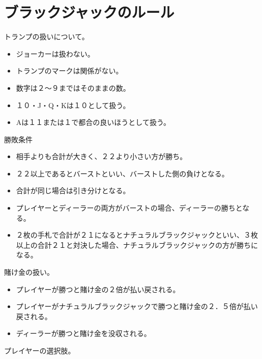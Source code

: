 \section{ブラックジャックのルール}
トランプの扱いについて。
\begin{itemize}
\item ジョーカーは扱わない。
\item トランプのマークは関係がない。
\item 数字は２～９まではそのままの数。
\item １０・J・Q・Kは１０として扱う。
\item Aは１１または１で都合の良いほうとして扱う。
\end{itemize}
勝敗条件
\begin{itemize}
\item 相手よりも合計が大きく、２２より小さい方が勝ち。
\item ２２以上であるとバーストといい、バーストした側の負けとなる。
\item 合計が同じ場合は引き分けとなる。
\item プレイヤーとディーラーの両方がバーストの場合、ディーラーの勝ちとなる。
\item ２枚の手札で合計が２１になるとナチュラルブラックジャックといい、３枚以上の合計２１と対決した場合、ナチュラルブラックジャックの方が勝ちになる。
\end{itemize}
賭け金の扱い。
\begin{itemize}
\item プレイヤーが勝つと賭け金の２倍が払い戻される。
\item プレイヤーがナチュラルブラックジャックで勝つと賭け金の２．５倍が払い戻される。
\item ディーラーが勝つと賭け金を没収される。
\end{itemize}
プレイヤーの選択肢。
